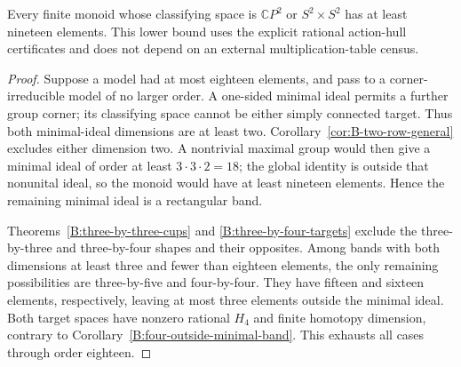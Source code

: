\begin{corollary}
\label{B:fourdim-lower19}
Every finite monoid whose classifying space is $\mathbb CP^2$ or
$S^2\times S^2$ has at least nineteen elements.
This lower bound uses the explicit rational action-hull certificates
and does not depend on an external multiplication-table census.
\end{corollary}
\begin{proof}
Suppose a model had at most eighteen elements, and pass to a
corner-irreducible model of no larger order.  A one-sided minimal
ideal permits a further group corner; its classifying space cannot
be either simply connected target.  Thus both minimal-ideal
dimensions are at least two.  Corollary~\ref{cor:B-two-row-general}
excludes either dimension two.  A nontrivial maximal group would
then give a minimal ideal of order at least $3\cdot3\cdot2=18$;
the global identity is outside that nonunital ideal, so the monoid
would have at least nineteen elements.  Hence the remaining minimal
ideal is a rectangular band.

Theorems~\ref{B:three-by-three-cups} and
\ref{B:three-by-four-targets} exclude the three-by-three and
three-by-four shapes and their opposites.  Among bands with both
dimensions at least three and fewer than eighteen elements, the only
remaining possibilities are three-by-five and four-by-four.
They have fifteen and sixteen elements, respectively, leaving at
most three elements outside the minimal ideal.  Both target spaces
have nonzero rational $H_4$ and finite homotopy dimension, contrary
to Corollary~\ref{B:four-outside-minimal-band}.
This exhausts all cases through order eighteen.
\end{proof}
